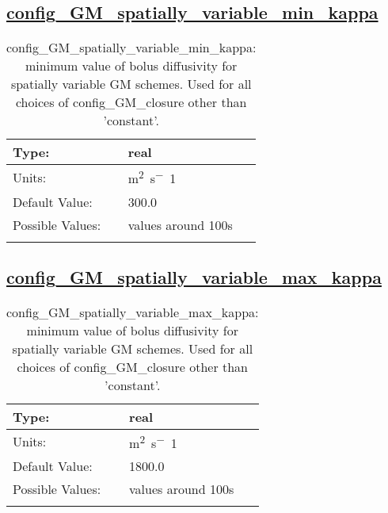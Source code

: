 \subsection[config\_GM\_spatially\_variable\_min\_kappa]{\hyperref[sec:nm_tab_GM_eddy_parameterization]{config\_GM\_spatially\_variable\_min\_kappa}}
\label{subsec:nm_sec_config_GM_spatially_variable_min_kappa}
\begin{center}
\begin{longtable}{| p{2.0in} || p{4.0in} |}
    \hline
    Type: & real \\
    \hline
    Units: & \si{m^2.s^-1} \\
    \hline
    Default Value: & 300.0 \\
    \hline
    Possible Values: & values around 100s \\
    \hline
    \caption{config\_GM\_spatially\_variable\_min\_kappa: minimum value of bolus diffusivity for spatially variable GM schemes. Used for all choices of config\_GM\_closure other than 'constant'.}
\end{longtable}
\end{center}
\subsection[config\_GM\_spatially\_variable\_max\_kappa]{\hyperref[sec:nm_tab_GM_eddy_parameterization]{config\_GM\_spatially\_variable\_max\_kappa}}
\label{subsec:nm_sec_config_GM_spatially_variable_max_kappa}
\begin{center}
\begin{longtable}{| p{2.0in} || p{4.0in} |}
    \hline
    Type: & real \\
    \hline
    Units: & \si{m^2.s^-1} \\
    \hline
    Default Value: & 1800.0 \\
    \hline
    Possible Values: & values around 100s \\
    \hline
    \caption{config\_GM\_spatially\_variable\_max\_kappa: minimum value of bolus diffusivity for spatially variable GM schemes. Used for all choices of config\_GM\_closure other than 'constant'.}
\end{longtable}
\end{center}
